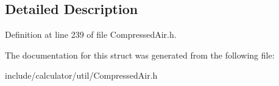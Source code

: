 \subsection{Detailed Description}


Definition at line 239 of file Compressed\+Air.\+h.



The documentation for this struct was generated from the following file\+:\begin{DoxyCompactItemize}
\item 
include/calculator/util/Compressed\+Air.\+h\end{DoxyCompactItemize}
